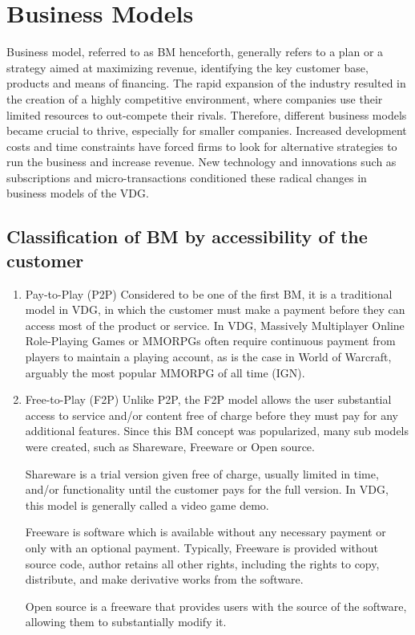 \documentclass[10pt,british,a4paper,titlepage]{article}
\begin{document}
\section{Business Models} 
Business model, referred to as BM henceforth, generally refers to a plan or a strategy aimed at maximizing revenue, identifying the key customer base, products and means of financing. The rapid expansion of the industry resulted in the creation of a highly competitive environment, where companies use their limited resources to out-compete their rivals\cite{osathanunkul2015classification:business}. Therefore, different business models became crucial to thrive, especially for smaller companies. Increased development costs and time constraints have forced firms to look for alternative strategies to run the business and increase revenue. New technology and innovations such as subscriptions and micro-transactions conditioned these radical changes in business models of the VDG\cite{osathanunkul2015classification:business}.



\subsection{Classification of BM by accessibility of the customer}
\begin{enumerate} 

\item Pay-to-Play (P2P)
Considered to be one of the first BM, it is a traditional model in VDG, in which the customer must make a payment before they can access most of the product or service. In VDG, Massively Multiplayer Online Role-Playing Games or MMORPGs often require continuous payment from players to maintain a playing account, as is the case in World of Warcraft, arguably the most popular MMORPG of all time (IGN).

\item Free-to-Play (F2P) 
Unlike P2P, the F2P model allows the user substantial access to service and/or content free of charge before they must pay for any additional features. Since this BM concept was popularized, many sub models were created, such as Shareware, Freeware or Open source.

Shareware is a trial version given free of charge, usually limited in time, and/or functionality until the customer pays for the full version. In VDG, this model is generally called a video game demo\cite{osathanunkul2015classification:business}.

Freeware is software which is available without any necessary payment or only with an optional payment. Typically, Freeware is provided without source code, author retains all other rights, including the rights to copy, distribute, and make derivative works from the software\cite{Graham:LBCI}.

Open source is a freeware that provides users with the source of the software, allowing them to substantially modify it. 

\end{enumerate}
\end{document}
